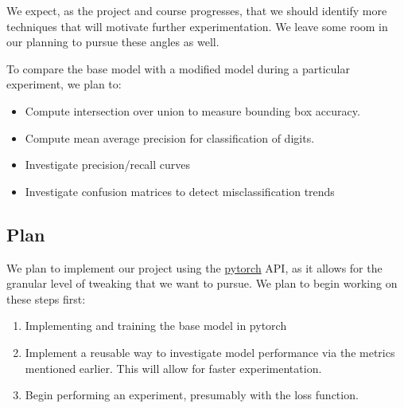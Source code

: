 \documentclass{article}
\begin{document}
We expect, as the project and course progresses, that we should identify more techniques that will motivate further experimentation. We leave some room in our planning to pursue these angles as well. 

To compare the base model with a modified model during a particular experiment, we plan to:
\begin{itemize}
	\item Compute intersection over union to measure bounding box accuracy.
	\item Compute mean average precision for classification of digits.
	\item Investigate precision/recall curves
	\item Investigate confusion matrices to detect misclassification trends
\end{itemize}

\subsection{Plan}
We plan to implement our project using the \href{https://pytorch.org/}{pytorch} API, as it allows for the granular level of tweaking that we want to pursue. We plan to begin working on these steps first:
\begin{enumerate}
	\item Implementing and training the base model in pytorch
	\item Implement a reusable way to investigate model performance via the metrics mentioned earlier. This will allow for faster experimentation.
	\item Begin performing an experiment, presumably with the loss function. 
\end{enumerate}



\end{document}
